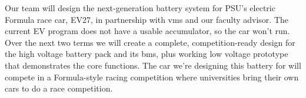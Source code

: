 Our team will design the next-generation battery system for PSU’s electric Formula race car, EV27, in partnership with \gls{vms} and our faculty advisor. The current EV program does not have a usable accumulator, so the car won’t run. Over the next two terms we will create a complete, competition-ready design for the high voltage battery pack and its \gls{bms}, plus working low voltage prototype that demonstrates the core functions. The car we’re designing this battery for will compete in a Formula-style racing competition where universities bring their own cars to do a race competition.

